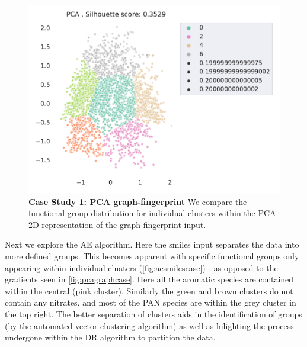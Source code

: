 \begin{figure}[H]
    \centering
    \includegraphics[width=\textwidth]{outputs/PCA/fingerprints_all.pdf}
    \caption{\textbf{Case Study 1: PCA graph-fingerprint} We compare the functional group distribution for individual clusters within the PCA 2D representation of the graph-fingerprint input.}
    \label{fig:pcagraphcase}
\end{figure}

\newpage

Next we explore the AE algorithm. Here the smiles input separates the data into more defined groups. This becomes apparent with specific functional groups only appearing within individual cluaters (\autoref{fig:aesmilescase}) - as opposed to the gradients seen in \autoref{fig:pcagraphcase}. Here all the aromatic species are contained within the central (pink cluster). Similarly the green and brown clusters do not contain any nitrates, and most of the PAN species are within the grey cluster in the top right. The better separation of clusters aids in the identification of groups (by the automated vector clustering algorithm) as well as hilighting the process undergone within the DR algorithm to partition the data.






